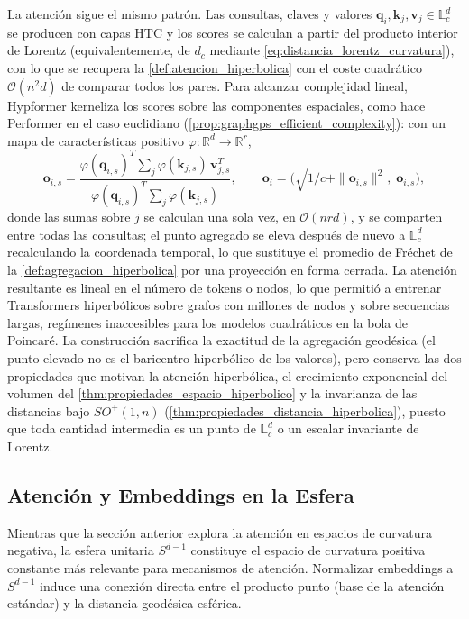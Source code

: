 La atención sigue el mismo patrón. Las consultas, claves y valores $\mathbf{q}_i, \mathbf{k}_j, \mathbf{v}_j \in \mathbb{L}^d_c$ se producen con capas HTC y los scores se calculan a partir del producto interior de Lorentz (equivalentemente, de $d_c$ mediante \eqref{eq:distancia_lorentz_curvatura}), con lo que se recupera la \autoref{def:atencion_hiperbolica} con el coste cuadrático $\mathcal{O}(n^2 d)$ de comparar todos los pares. Para alcanzar complejidad lineal, Hypformer kerneliza los scores sobre las componentes espaciales, como hace Performer en el caso euclidiano (\autoref{prop:graphgps_efficient_complexity}): con un mapa de características positivo $\varphi: \mathbb{R}^d \to \mathbb{R}^{r}$,
\begin{equation}
    \mathbf{o}_{i,s} = \frac{\varphi(\mathbf{q}_{i,s})^T \sum_{j} \varphi(\mathbf{k}_{j,s})\, \mathbf{v}_{j,s}^T}{\varphi(\mathbf{q}_{i,s})^T \sum_{j} \varphi(\mathbf{k}_{j,s})},
    \qquad
    \mathbf{o}_i = \Big(\sqrt{1/c + \|\mathbf{o}_{i,s}\|^2}, \; \mathbf{o}_{i,s}\Big),
    \label{eq:hypformer_atencion_lineal}
\end{equation}
donde las sumas sobre $j$ se calculan una sola vez, en $\mathcal{O}(n r d)$, y se comparten entre todas las consultas; el punto agregado se eleva después de nuevo a $\mathbb{L}^d_c$ recalculando la coordenada temporal, lo que sustituye el promedio de Fréchet de la \autoref{def:agregacion_hiperbolica} por una proyección en forma cerrada. La atención resultante es lineal en el número de tokens o nodos, lo que permitió a \citet{yang2024hypformer} entrenar \glspl{Transformer} hiperbólicos sobre grafos con millones de nodos y sobre secuencias largas, regímenes inaccesibles para los modelos cuadráticos en la bola de Poincaré. La construcción sacrifica la exactitud de la agregación geodésica (el punto elevado no es el baricentro hiperbólico de los valores), pero conserva las dos propiedades que motivan la atención hiperbólica, el crecimiento exponencial del volumen del \autoref{thm:propiedades_espacio_hiperbolico} y la invarianza de las distancias bajo $SO^+(1,n)$ (\autoref{thm:propiedades_distancia_hiperbolica}), puesto que toda cantidad intermedia es un punto de $\mathbb{L}^d_c$ o un escalar invariante de Lorentz.

\subsection{Atención y Embeddings en la Esfera}\label{subsec:atencion_esfera}

Mientras que la sección anterior explora la atención en espacios de curvatura negativa, la esfera unitaria $S^{d-1}$ constituye el espacio de curvatura positiva constante más relevante para mecanismos de atención. Normalizar embeddings a $S^{d-1}$ induce una conexión directa entre el producto punto (base de la atención estándar) y la distancia geodésica esférica.

